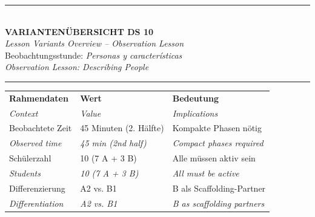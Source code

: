 \documentclass[11pt, a4paper]{article}
\newcommand{\es}[1]{\textcolor{spanisch}{\textit{#1}}}
\newcommand{\en}[1]{{\small\color{english}\textit{#1}}}
\begin{document}

\begin{center}
{\color{spanisch}\rule{\textwidth}{2pt}}\\[0.4cm]
{\LARGE\bfseries VARIANTENÜBERSICHT DS 10}\\[0.1cm]
\en{Lesson Variants Overview -- Observation Lesson}\\[0.3cm]
{\large Beobachtungsstunde: \es{Personas y características}}\\[0.1cm]
\en{Observation Lesson: Describing People}\\[0.3cm]
{\color{spanisch}\rule{\textwidth}{2pt}}
\end{center}

\vspace{0.3cm}


\begin{center}
\small
\begin{tabular}{|p{3.5cm}|p{5cm}|p{6cm}|}
\hline
\rowcolor{hellgrau}
\textbf{Rahmendaten} & \textbf{Wert} & \textbf{Bedeutung} \\
\en{Context} & \en{Value} & \en{Implications} \\
\hline
Beobachtete Zeit & 45 Minuten (2. Hälfte) & Kompakte Phasen nötig \\
\en{Observed time} & \en{45 min (2nd half)} & \en{Compact phases required} \\
\hline
Schülerzahl & 10 (7 A + 3 B) & Alle müssen aktiv sein \\
\en{Students} & \en{10 (7 A + 3 B)} & \en{All must be active} \\
\hline
Differenzierung & A2 vs. B1 & B als Scaffolding-Partner \\
\en{Differentiation} & \en{A2 vs. B1} & \en{B as scaffolding partners} \\
\hline
\end{tabular}
\end{center}

\vspace{0.4cm}

\end{document}
